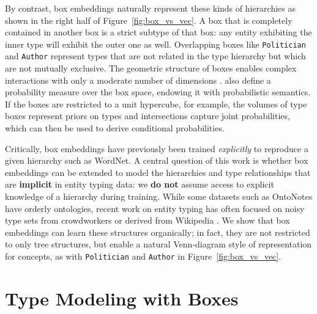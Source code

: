 \documentclass[11pt,a4paper]{article}
\begin{document}


By contrast, box embeddings naturally represent these kinds of hierarchies as shown in the right half of Figure~\ref{fig:box_vs_vec}. A box that is completely contained in another box is a strict subtype of that box: any entity exhibiting the inner type will exhibit the outer one as well. Overlapping boxes like {\tt Politician} and {\tt Author} represent types that are not related in the type hierarchy but which are not mutually exclusive.
The geometric structure of boxes enables complex interactions with only a moderate number of dimensions \cite{Shib_Sankar_Dasgupta_20}.
\citet{Luke_Vilnis_18}
also define a probability measure over the box space, endowing it with probabilistic semantics. If the boxes are restricted to a unit hypercube, for example, the volumes of type boxes represent priors on types and intersections capture joint probabilities, which can then be used to derive conditional probabilities.

Critically, box embeddings have previously been trained \emph{explicitly} to reproduce a given hierarchy such as WordNet. A central question of this work is whether box embeddings can be extended to model the hierarchies and type relationships that are \textbf{implicit} in entity typing data: we \textbf{do not} assume access to explicit knowledge of a hierarchy during training. While some datasets such as OntoNotes have orderly ontologies, recent work on entity typing has often focused on noisy type sets from crowdworkers \cite{Eunsol_Choi_18} or derived from Wikipedia \cite{Yasumasa_Onoe_20}. We show that box embeddings can learn these structures organically; in fact, they are not restricted to only tree structures, but enable a natural Venn-diagram style of representation for concepts, as with {\tt Politician} and {\tt Author} in Figure~\ref{fig:box_vs_vec}.



\section{Type Modeling with Boxes}
\label{sec:types_with_boxes}
\end{document}
